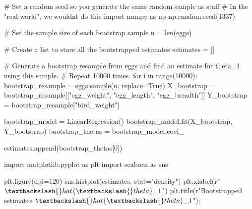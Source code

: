 \documentclass[
  letterpaper,
  DIV=11,
  numbers=noendperiod]{scrreprt}
\newenvironment{Shaded}{\begin{snugshade}}{\end{snugshade}}
\newcommand{\BuiltInTok}[1]{\textcolor[rgb]{0.00,0.23,0.31}{#1}}
\newcommand{\CommentTok}[1]{\textcolor[rgb]{0.37,0.37,0.37}{#1}}
\newcommand{\ControlFlowTok}[1]{\textcolor[rgb]{0.00,0.23,0.31}{#1}}
\newcommand{\DecValTok}[1]{\textcolor[rgb]{0.68,0.00,0.00}{#1}}
\newcommand{\ImportTok}[1]{\textcolor[rgb]{0.00,0.46,0.62}{#1}}
\newcommand{\KeywordTok}[1]{\textcolor[rgb]{0.00,0.23,0.31}{#1}}
\newcommand{\NormalTok}[1]{\textcolor[rgb]{0.00,0.23,0.31}{#1}}
\newcommand{\OperatorTok}[1]{\textcolor[rgb]{0.37,0.37,0.37}{#1}}
\newcommand{\StringTok}[1]{\textcolor[rgb]{0.13,0.47,0.30}{#1}}
\newcommand{\VariableTok}[1]{\textcolor[rgb]{0.07,0.07,0.07}{#1}}
\newcommand{\VerbatimStringTok}[1]{\textcolor[rgb]{0.13,0.47,0.30}{#1}}
\begin{document}
\begin{Shaded}
\begin{Highlighting}[]
\CommentTok{\# Set a random seed so you generate the same random sample as staff}
\CommentTok{\# In the "real world", we wouldn\textquotesingle{}t do this}
\ImportTok{import}\NormalTok{ numpy }\ImportTok{as}\NormalTok{ np}
\NormalTok{np.random.seed(}\DecValTok{1337}\NormalTok{)}

\CommentTok{\# Set the sample size of each bootstrap sample}
\NormalTok{n }\OperatorTok{=} \BuiltInTok{len}\NormalTok{(eggs)}

\CommentTok{\# Create a list to store all the bootstrapped estimates}
\NormalTok{estimates }\OperatorTok{=}\NormalTok{ []}

\CommentTok{\# Generate a bootstrap resample from \textasciigrave{}eggs\textasciigrave{} and find an estimate for theta\_1 using this sample. }
\CommentTok{\# Repeat 10000 times.}
\ControlFlowTok{for}\NormalTok{ i }\KeywordTok{in} \BuiltInTok{range}\NormalTok{(}\DecValTok{10000}\NormalTok{):}
\NormalTok{    bootstrap\_resample }\OperatorTok{=}\NormalTok{ eggs.sample(n, replace}\OperatorTok{=}\VariableTok{True}\NormalTok{)}
\NormalTok{    X\_bootstrap }\OperatorTok{=}\NormalTok{ bootstrap\_resample[[}\StringTok{"egg\_weight"}\NormalTok{, }\StringTok{"egg\_length"}\NormalTok{, }\StringTok{"egg\_breadth"}\NormalTok{]]}
\NormalTok{    Y\_bootstrap }\OperatorTok{=}\NormalTok{ bootstrap\_resample[}\StringTok{"bird\_weight"}\NormalTok{]}
    
\NormalTok{    bootstrap\_model }\OperatorTok{=}\NormalTok{ LinearRegression()}
\NormalTok{    bootstrap\_model.fit(X\_bootstrap, Y\_bootstrap)}
\NormalTok{    bootstrap\_thetas }\OperatorTok{=}\NormalTok{ bootstrap\_model.coef\_}
    
\NormalTok{    estimates.append(bootstrap\_thetas[}\DecValTok{0}\NormalTok{])}
\end{Highlighting}
\end{Shaded}

\begin{Shaded}
\begin{Highlighting}[]
\ImportTok{import}\NormalTok{ matplotlib.pyplot }\ImportTok{as}\NormalTok{ plt}
\ImportTok{import}\NormalTok{ seaborn }\ImportTok{as}\NormalTok{ sns}

\NormalTok{plt.figure(dpi}\OperatorTok{=}\DecValTok{120}\NormalTok{)}
\NormalTok{sns.histplot(estimates, stat}\OperatorTok{=}\StringTok{"density"}\NormalTok{)}
\NormalTok{plt.xlabel(}\VerbatimStringTok{r"$\textbackslash{}hat\{\textbackslash{}theta\}\_1$"}\NormalTok{)}
\NormalTok{plt.title(}\VerbatimStringTok{r"Bootstrapped estimates $\textbackslash{}hat\{\textbackslash{}theta\}\_1$"}\NormalTok{)}\OperatorTok{;}
\end{Highlighting}
\end{Shaded}
\end{document}
